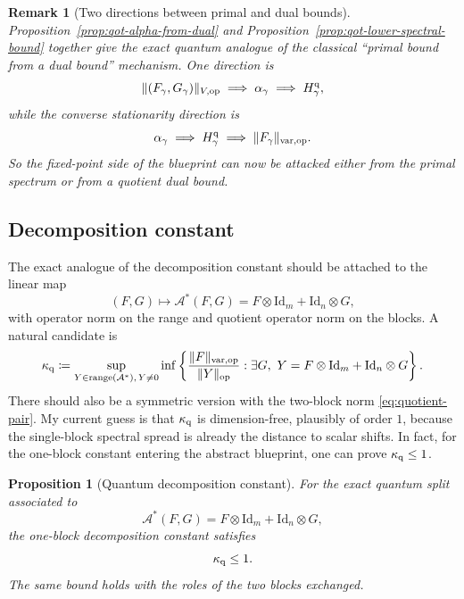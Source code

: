 \documentclass[11pt]{article}
\newcommand{\Id}{\mathrm{Id}}
\newcommand{\eqdef}{\coloneqq}
\newcommand{\Aa}{\mathcal{A}}
\newcommand{\op}{\mathrm{op}}
\newcommand{\varop}{\mathrm{var},\op}
\theoremstyle{plain}
\newtheorem{proposition}{Proposition}[section]
\newtheorem{remark}{Remark}[section]
\begin{document}
\begin{remark}[Two directions between primal and dual bounds]
\label{rem:qot-primal-dual-two-directions}
Proposition~\ref{prop:qot-alpha-from-dual} and Proposition~\ref{prop:qot-lower-spectral-bound} together give the exact quantum analogue of the classical ``primal bound from a dual bound'' mechanism.
One direction is
\[
\|(F_\gamma,G_\gamma)\|_{V,\op}
\;\Longrightarrow\;
\alpha_\gamma
\;\Longrightarrow\;
H_\gamma^{\rm q},
\]
while the converse stationarity direction is
\[
\alpha_\gamma
\;\Longrightarrow\;
H_\gamma^{\rm q}
\;\Longrightarrow\;
\|F_\gamma\|_{\varop}.
\]
So the fixed-point side of the blueprint can now be attacked either from the primal spectrum or from a quotient dual bound.
\end{remark}

\subsection{Decomposition constant}

The exact analogue of the decomposition constant should be attached to the linear map
\[
(F,G) \mapsto \Aa^\ast(F,G)=F \otimes \Id_m + \Id_n \otimes G,
\]
with operator norm on the range and quotient operator norm on the blocks.
A natural candidate is
\begin{equation}
\label{eq:quantum-kappa}
\kappa_{\rm q}
\eqdef
\sup_{Y \in \mathrm{range}(\Aa^\ast),\,Y\neq 0}
\inf\left\{
\frac{\|F\|_{\varop}}{\|Y\|_{\op}}
:
\exists G,\ Y=F \otimes \Id_m+\Id_n \otimes G
\right\}.
\end{equation}
There should also be a symmetric version with the two-block norm \eqref{eq:quotient-pair}.
My current guess is that $\kappa_{\rm q}$ is dimension-free, plausibly of order $1$, because the single-block spectral spread is already the distance to scalar shifts.
In fact, for the one-block constant entering the abstract blueprint, one can prove $\kappa_{\rm q}\le 1$.

\begin{proposition}[Quantum decomposition constant]\label{prop:qot-kappa}
For the exact quantum split associated to
\[
\Aa^\ast(F,G)=F \otimes \Id_m + \Id_n \otimes G,
\]
the one-block decomposition constant satisfies
\[
\kappa_{\rm q}\le 1.
\]
The same bound holds with the roles of the two blocks exchanged.
\end{proposition}
\end{document}

